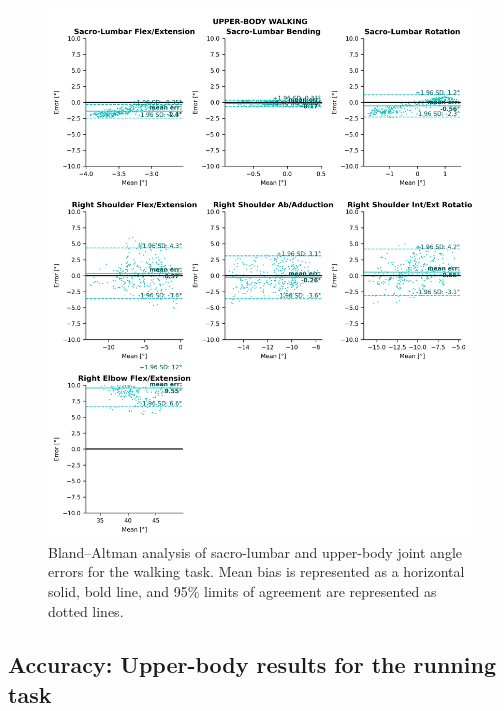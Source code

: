 \begin{figure}[!ht]
	\centering
	\def\svgwidth{1\columnwidth}
	\fontsize{10pt}{10pt}\selectfont
	\includegraphics[height=\dimexpr\textheight-119pt]{"../Annexes/Figures/Fig_BlandWalkUp.png"}
	\caption{Bland–Altman analysis of sacro-lumbar and upper-body joint angle errors for the walking task. Mean bias is represented as a horizontal solid, bold line, and 95\% limits of agreement are represented as dotted lines.}
	\label{fig_blandwalkup}
\end{figure}

\clearpage
\subsection{Accuracy: Upper-body results for the running task}

